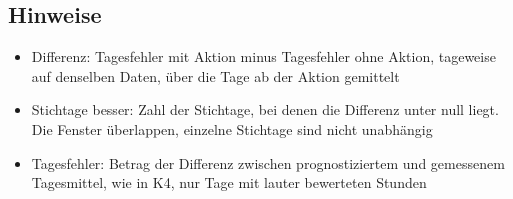 \subsection*{Hinweise}
\begin{itemize}
\item Differenz: Tagesfehler mit Aktion minus Tagesfehler ohne Aktion, tageweise auf denselben Daten, über die Tage ab der Aktion gemittelt
\item Stichtage besser: Zahl der Stichtage, bei denen die Differenz unter null liegt. Die Fenster überlappen, einzelne Stichtage sind nicht unabhängig
\item Tagesfehler: Betrag der Differenz zwischen prognostiziertem und gemessenem Tagesmittel, wie in K4, nur Tage mit lauter bewerteten Stunden
\end{itemize}
